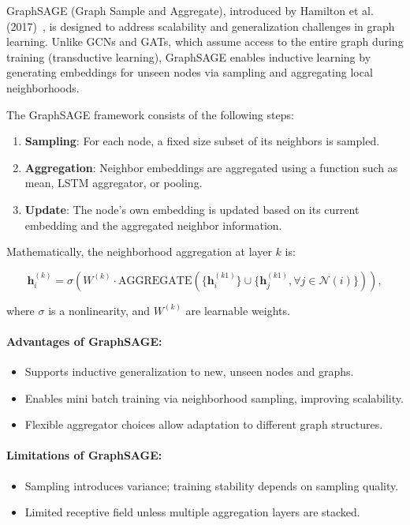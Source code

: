 \documentclass{article}
\begin{document}
GraphSAGE (Graph Sample and Aggregate), introduced by Hamilton et al. (2017)~\cite{hamilton_2018_inductive}, is designed to address scalability and generalization challenges in graph learning. Unlike GCNs and GATs, which assume access to the entire graph during training (transductive learning), GraphSAGE enables inductive learning by generating embeddings for unseen nodes via sampling and aggregating local neighborhoods\cite{liu_2023_graphsagebased}.

The GraphSAGE framework consists of the following steps:
\begin{enumerate}
    \item \textbf{Sampling}: For each node, a fixed size subset of its neighbors is sampled.
    \item \textbf{Aggregation}: Neighbor embeddings are aggregated using a function such as mean, LSTM aggregator, or pooling.
    \item \textbf{Update}: The node’s own embedding is updated based on its current embedding and the aggregated neighbor information.
\end{enumerate}

Mathematically, the neighborhood aggregation at layer \(k\) is:

\[
\mathbf{h}_i^{(k)} = \sigma \left( W^{(k)} \cdot \text{AGGREGATE} \left( \{ \mathbf{h}_i^{(k 1)} \} \cup \{ \mathbf{h}_j^{(k 1)}, \forall j \in \mathcal{N}(i) \} \right) \right),
\]

where \(\sigma\) is a nonlinearity, and \(W^{(k)}\) are learnable weights.

\paragraph{Advantages of GraphSAGE:}
\begin{itemize}
    \item Supports inductive generalization to new, unseen nodes and graphs.
    \item Enables mini batch training via neighborhood sampling, improving scalability.
    \item Flexible aggregator choices allow adaptation to different graph structures.
\end{itemize}

\paragraph{Limitations of GraphSAGE:}
\begin{itemize}
    \item Sampling introduces variance; training stability depends on sampling quality.
    \item Limited receptive field unless multiple aggregation layers are stacked.
\end{itemize}
\end{document}
